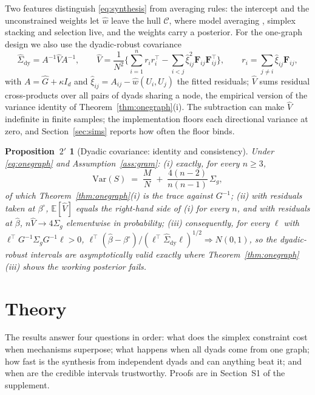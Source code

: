 \documentclass[12pt]{article}
\newcommand{\E}{\mathbb{E}}
\newcommand{\calC}{\mathcal{C}}
\newcommand{\bproj}{\beta^{\circ}}
\newcommand{\what}{\hat w}
\newcommand{\bhat}{\hat\beta}
\newcommand{\Sighat}{\hat\Sigma}
\newcommand{\Ghat}{\hat G}
\newcommand{\Fv}{\mathbf{F}}
\newtheorem*{propprime}{Proposition~$2'$}
\newcommand{\Var}{\mathrm{Var}}
\begin{document}
Two features distinguish \eqref{eq:synthesis} from averaging rules: the intercept and the unconstrained weights let $\what$ leave the hull $\calC$, where model averaging \citep{Heo2025}, simplex stacking \citep{YaoEtAl2018} and selection live, and the weights carry a posterior. For the one-graph design we also use the dyadic-robust covariance
\begin{equation}
\label{eq:dyadic}
\Sighat_{\mathrm{dy}}=A^{-1}\hat V A^{-1},\qquad \hat V=\frac{1}{N^2}\Big\{\sum_{i=1}^{n}r_ir_i^{\top}-\sum_{i<j}\hat\xi_{ij}^2\Fv_{ij}\Fv_{ij}^{\top}\Big\},\qquad r_i=\sum_{j\neq i}\hat\xi_{ij}\Fv_{ij},
\end{equation}
with $A=\Ghat+\kappa I_d$ and $\hat\xi_{ij}=A_{ij}-\what(U_i,U_j)$ the fitted residuals; $\hat V$ sums residual cross-products over all pairs of dyads sharing a node, the empirical version of the variance identity of Theorem~\ref{thm:onegraph}(i). The subtraction can make $\hat V$ indefinite in finite samples; the implementation floors each directional variance at zero, and Section~\ref{sec:sims} reports how often the floor binds.

\begin{propprime}[Dyadic covariance: identity and consistency]
Under \eqref{eq:onegraph} and Assumption~\ref{ass:gram}: (i) exactly, for every $n\ge3$,
\[
\Var(S)\;=\;\frac{M}{N}\;+\;\frac{4(n-2)}{n(n-1)}\,\Sigma_g,
\]
of which Theorem~\ref{thm:onegraph}(i) is the trace against $G^{-1}$; (ii) with residuals taken at $\bproj$, $\E[\hat V]$ equals the right-hand side of (i) for every $n$, and with residuals at $\bhat$, $n\hat V\to4\Sigma_g$ elementwise in probability; (iii) consequently, for every $\ell$ with $\ell^{\top}G^{-1}\Sigma_gG^{-1}\ell>0$, $\ell^{\top}(\bhat-\bproj)/(\ell^{\top}\Sighat_{\mathrm{dy}}\ell)^{1/2}\Rightarrow N(0,1)$, so the dyadic-robust intervals are asymptotically valid exactly where Theorem~\ref{thm:onegraph}(iii) shows the working posterior fails.
\end{propprime}

\section{Theory}
\label{sec:theory}

The results answer four questions in order: what does the simplex constraint cost when mechanisms superpose; what happens when all dyads come from one graph; how fast is the synthesis from independent dyads and can anything beat it; and when are the credible intervals trustworthy. Proofs are in Section~S1 of the supplement.
\end{document}
